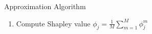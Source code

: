 \documentclass[11pt,compress,t,notes=noshow, aspectratio=169, xcolor=table]{beamer}
\begin{document}
\begin{frame}{Approximation Algorithm }
\begin{enumerate}[<+->]
    \item Compute Shapley value $\phi_j = \frac{1}{M}\sum_{m=1}^M \phi_j^m$ %
  \end{enumerate}
   
   

\end{frame}
\end{document}
